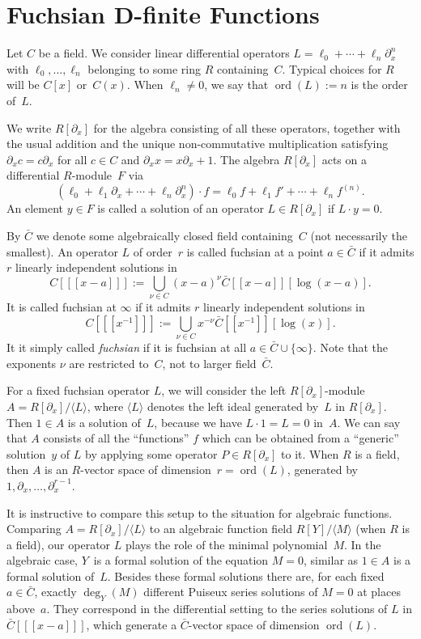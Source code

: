 \documentclass{sig-alternate}
\def\ord{\operatorname{ord}}
\def\<#1>{\langle#1\rangle}
\begin{document}
\section{Fuchsian D-finite Functions}

Let $C$ be a field. We consider linear differential operators
$L=\ell_0+\cdots+\ell_n\partial_x^n$ with $\ell_0,\dots,\ell_n$ belonging to some ring
$R$ containing~$C$.
Typical choices for $R$ will be $C[x]$ or~$C(x)$.
When $\ell_n\neq0$, we say that $\ord(L):=n$ is the order of~$L$.

We write $R[\partial_x]$ for the algebra consisting of all these operators, together
with the usual addition and the unique non-commutative multiplication satisfying
$\partial_xc=c\partial_x$ for all $c\in C$ and $\partial_xx=x\partial_x+1$.
The algebra $R[\partial_x]$ acts on a differential $R$-module~$F$ via
\[
  (\ell_0+\ell_1\partial_x+\cdots+\ell_n\partial_x^n)\cdot f=
   \ell_0f + \ell_1f' + \cdots + \ell_n f^{(n)}.
\]
An element $y\in F$ is called a solution of an operator $L\in R[\partial_x]$ if
$L\cdot y=0$.

By $\bar C$ we denote some algebraically closed field containing~$C$ (not necessarily the smallest). 
An operator $L$ of order~$r$ is called fuchsian at a point $a\in\bar C$ if
it admits $r$ linearly independent solutions in
\[
  C[[[x-a]]] := \bigcup_{\nu\in C} (x-a)^\nu\bar C[[x-a]][\log(x-a)].
\]
It is called fuchsian at $\infty$ if it admits $r$ linearly independent solutions in
\[
  C[[[x^{-1}]]] := \bigcup_{\nu\in C} x^{-\nu} \bar C[[x^{-1}]][\log(x)].
\]
It it simply called \emph{fuchsian} if it is fuchsian at all $a\in\bar C\cup\{\infty\}$.
Note that the exponents $\nu$ are restricted to~$C$, not to larger field~$\bar C$.

For a fixed fuchsian operator $L$, we will consider the left $R[\partial_x]$-module
$A=R[\partial_x]/\<L>$, where $\<L>$ denotes the left ideal generated by~$L$ in
$R[\partial_x]$.  Then $1\in A$ is a solution of~$L$, because we have $L\cdot 1=L=0$
in~$A$. We can say that $A$ consists of all the ``functions'' $f$ which can be
obtained from a ``generic'' solution~$y$ of $L$ by applying some operator $P\in
R[\partial_x]$ to it. When $R$ is a field, then $A$ is an $R$-vector space of
dimension~$r=\ord(L)$, generated by $1,\partial_x,\dots,\partial_x^{r-1}$.

It is instructive to compare this setup to the situation for algebraic
functions. Comparing $A=R[\partial_x]/\<L>$ to an algebraic function field $R[Y]/\<M>$
(when $R$ is a field), our operator $L$ plays the role of the minimal
polynomial~$M$. In the algebraic case, $Y$~is a formal solution of the equation
$M=0$, similar as $1\in A$ is a formal solution of~$L$. Besides these formal
solutions there are, for each fixed $a\in\bar C$, exactly $\deg_Y(M)$ different
Puiseux series solutions of $M=0$ at places above~$a$. They correspond in the
differential setting to the series solutions of $L$ in $\bar C[[[x-a]]]$, which
generate a $\bar C$-vector space of dimension $\ord(L)$.
\end{document}
